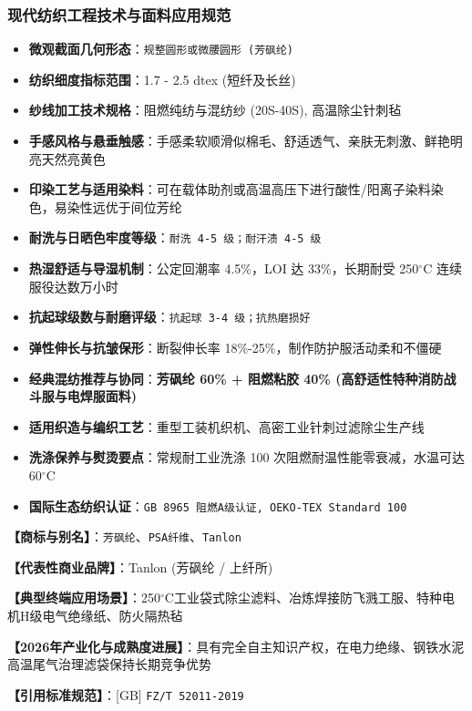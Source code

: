\documentclass[11pt,openright,twoside,UTF8]{ctexbook}
\begin{document}
\subsubsection*{现代纺织工程技术与面料应用规范}
\begin{itemize} \setlength{\itemsep}{2pt}
    \item \textbf{微观截面几何形态}：\texttt{规整圆形或微腰圆形 (芳砜纶)}
    \item \textbf{纺织细度指标范围}：1.7 - 2.5 dtex (短纤及长丝)
    \item \textbf{纱线加工技术规格}：阻燃纯纺与混纺纱 (20S-40S), 高温除尘针刺毡
    \item \textbf{手感风格与悬垂触感}：手感柔软顺滑似棉毛、舒适透气、亲肤无刺激、鲜艳明亮天然亮黄色
    \item \textbf{印染工艺与适用染料}：可在载体助剂或高温高压下进行酸性/阳离子染料染色，易染性远优于间位芳纶
    \item \textbf{耐洗与日晒色牢度等级}：\texttt{耐洗 4-5 级；耐汗渍 4-5 级}
    \item \textbf{热湿舒适与导湿机制}：公定回潮率 4.5\%，LOI 达 33\%，长期耐受 250$^\circ\mathrm{C}$ 连续服役达数万小时
    \item \textbf{抗起球级数与耐磨评级}：\texttt{抗起球 3-4 级；抗热磨损好}
    \item \textbf{弹性伸长与抗皱保形}：断裂伸长率 18\%-25\%，制作防护服活动柔和不僵硬
    \item \textbf{经典混纺推荐与协同}：\textbf{芳砜纶 60\% + 阻燃粘胶 40\% (高舒适性特种消防战斗服与电焊服面料)}
    \item \textbf{适用织造与编织工艺}：重型工装机织机、高密工业针刺过滤除尘生产线
    \item \textbf{洗涤保养与熨烫要点}：常规耐工业洗涤 100 次阻燃耐温性能零衰减，水温可达 60$^\circ\mathrm{C}$
    \item \textbf{国际生态纺织认证}：\texttt{GB 8965 阻燃A级认证, OEKO-TEX Standard 100}
\end{itemize}
\vspace{0.2cm}

\noindent\textbf{【商标与别名】}：\texttt{芳砜纶}、\texttt{PSA纤维}、\texttt{Tanlon}\par
\noindent\textbf{【代表性商业品牌】}：Tanlon (芳砜纶 / 上纤所)\par
\noindent\textbf{【典型终端应用场景】}：250$^\circ\mathrm{C}$工业袋式除尘滤料、冶炼焊接防飞溅工服、特种电机H级电气绝缘纸、防火隔热毡\par
\noindent\textbf{【2026年产业化与成熟度进展】}：具有完全自主知识产权，在电力绝缘、钢铁水泥高温尾气治理滤袋保持长期竞争优势\par
\noindent\textbf{【引用标准规范】}：[GB] \texttt{FZ/T 52011-2019}\par
\vspace{0.5cm}
\end{document}
